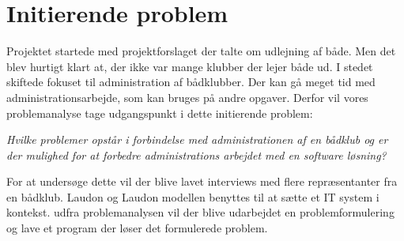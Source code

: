


\section{Initierende problem}
\label{initierende}
Projektet startede med projektforslaget der talte om udlejning af både. Men det blev hurtigt klart at, der ikke var mange klubber der lejer både ud. I stedet skiftede fokuset til administration af bådklubber. Der kan gå meget tid med administrationsarbejde, som kan bruges på andre opgaver. Derfor vil vores problemanalyse tage udgangspunkt i dette initierende problem:

\textit{Hvilke problemer opstår i forbindelse med administrationen af en bådklub og er der mulighed for at forbedre administrations arbejdet med en software løsning?}

For at undersøge dette vil der blive lavet interviews med flere repræsentanter fra en bådklub. Laudon og Laudon modellen benyttes til at sætte et IT system i kontekst. udfra problemanalysen vil der blive udarbejdet en problemformulering og lave et program der løser det formulerede problem.
